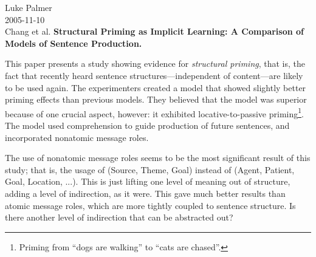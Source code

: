 \documentclass[12pt]{article}
\begin{document}
\noindent
Luke Palmer \\
2005-11-10 \\
Chang et al.  \textbf{Structural Priming as Implicit Learning: A
Comparison of Models of Sentence Production.}

\vspace{1cm}

This paper presents a study showing evidence for \textit{structural
priming}, that is, the fact that recently heard sentence
structures---independent of content---are likely to be used again. The
experimenters created a model that showed slightly better priming
effects than previous models.  They believed that the model was superior
because of one crucial aspect, however:  it exhibited
locative-to-passive priming\footnote{Priming from ``dogs are walking''
to ``cats are chased''.}.  The model used comprehension to guide
production of future sentences, and incorporated nonatomic message
roles.

The use of nonatomic message roles seems to be the most significant
result of this study; that is, the usage of (Source, Theme, Goal)
instead of (Agent, Patient, Goal, Location, ...).  This is just lifting
one level of meaning out of structure, adding a level of indirection, as
it were.  This gave much better results than atomic message roles, which
are more tightly coupled to sentence structure.  Is there another level
of indirection that can be abstracted out?
\end{document}
